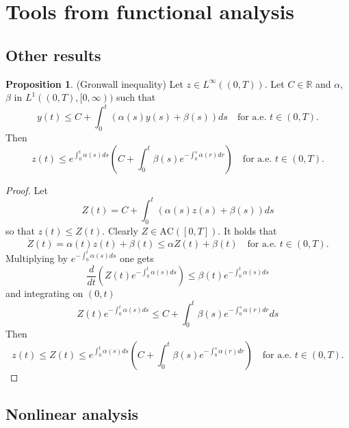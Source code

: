 \documentclass[letterpaper,oneside]{amsart}
\numberwithin{equation}{section}
\theoremstyle{definition}
\newtheorem{prop}{Proposition}[section]
\begin{document}
\section{Tools from functional analysis}

\subsection{Other results}

\begin{prop}(Gronwall inequality)
Let $z\in L^\infty((0,T))$. Let $C\in\mathbb{R}$ and $\alpha$, $\beta$ in $L^1((0,T),[0,\infty))$ such that
\begin{equation*}
y(t)\le C+\int_0^t\left(\alpha(s)y(s)+\beta(s)\right)ds\quad\text{for a.e. $t\in(0,T)$}.
\end{equation*}
Then
\begin{equation*}
z(t)\le e^{\int_0^t\alpha(s)ds}\left(C+\int_0^t\beta(s)e^{-\int_0^s\alpha(r)dr}\right)\quad\text{for a.e. $t\in(0,T)$}.
\end{equation*}
\end{prop}
\begin{proof}
Let
\begin{equation*}
Z(t)=C+\int_0^t\left(\alpha(s)z(s)+\beta(s)\right)ds
\end{equation*}
so that $z(t)\le Z(t)$. Clearly $Z\in\text{AC}([0,T])$. It holds that
\begin{equation*}
\dot Z(t)=\alpha(t)z(t)+\beta(t)\le\alpha Z(t)+\beta(t)\quad\text{for a.e. $t\in(0,T)$}.
\end{equation*}
Multiplying by $e^{-\int_0^t\alpha(s)ds}$ one gets
\begin{equation*}
\frac{d}{dt}\left(Z(t)e^{-\int_0^t\alpha(s)ds}\right)\le\beta(t)e^{-\int_0^t\alpha(s)ds}
\end{equation*}
and integrating on $(0,t)$
\begin{equation*}
Z(t)e^{-\int_0^t\alpha(s)ds}\le C+\int_0^t\beta(s)e^{-\int_0^s\alpha(r)dr}ds
\end{equation*}
Then
\begin{equation*}
z(t)\le Z(t)\le e^{\int_0^t\alpha(s)ds}\left(C+\int_0^t\beta(s)e^{-\int_0^s\alpha(r)dr}\right)\quad\text{for a.e. $t\in(0,T)$}.
\end{equation*}
\end{proof}

\subsection{Nonlinear analysis}
\end{document}
